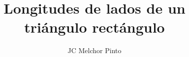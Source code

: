 \documentclass[12pt,addpoints,answers]{guia}
\title{Longitudes de lados de un triángulo rectángulo}
\author{JC Melchor Pinto}
\begin{document}
\INFO%
\begin{multicols}{2}
    
    
    
\end{multicols}
\ejemplosboxed[]
\begin{questions}
    \questionboxed[10]{}
    \questionboxed[10]{}
    \questionboxed[10]{}
    \questionboxed[10]{}
    \questionboxed[10]{}
    \questionboxed[10]{}
    \questionboxed[10]{}
    \questionboxed[15]{}
    \questionboxed[15]{}
\end{questions}
\end{document}
